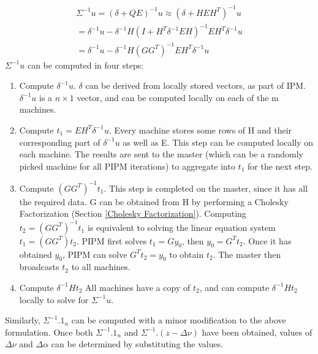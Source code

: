 \documentclass[12pt]{article}
\begin{document}
 \begin{gather} 
\Sigma^{-1}u = (\delta+QE)^{-1}u \approx (\delta+HEH^T)^{-1}u\\
= \delta^{-1}u - \delta^{-1}H(I + H^T \delta^{-1}EH)^{-1}EH^T \delta^{-1}u\\
= \delta^{-1}u - \delta^{-1}H(GG^{T})^{-1}EH^T \delta^{-1}u
\end{gather}
$\Sigma^{-1}u$ can be computed in four steps:
\begin{enumerate}
\item Compute $\delta^{-1}u$. $\delta$ can be derived from locally stored vectors, as part of IPM. $\delta^{-1}u$ is a $n \times 1$ vector, and can be computed locally on each of the m machines.
\item Compute $t_{1} = EH^{T} \delta^{-1}u$. Every machine stores some rows of H and their corresponding part of $\delta^{-1}u$ as well as E. This step can be computed locally on each machine. The results are sent to the master (which can be a randomly picked machine for all PIPM iterations) to aggregate into $t_{1}$ for the next step.
\item Compute $(GG^T )^{-1}t_{1}$. This step is completed on the master, since it has all the required data. G can be obtained from H by performing a Cholesky Factorization (Section \ref{Cholesky Factorization}). Computing $t_{2} = (GG^T )^{-1}t_{1}$ is equivalent to solving the linear equation system $t_{1} = (GG^T )t_{2}$. PIPM first solves $t_{1} = Gy_{0}$, then $y_{0} = G^T t_{2}$. Once it has obtained $y_{0}$, PIPM can solve $G^T t_{2} = y_{0}$ to obtain $t_{2}$. The master then broadcasts $t_{2}$ to all machines.
\item Compute $\delta^{-1}Ht_{2}$ All machines have a copy of $t_{2}$, and can compute $\delta^{-1}Ht_{2}$ locally to solve for $\Sigma^{-1}u$.
\end{enumerate}
Similarly, $\Sigma^{-1}.1_{n}$ can be computed with a minor modification to the above formulation. Once both $\Sigma^{-1}.1_{n}$ and $\Sigma^{-1}.(z - \Delta\nu)$ have been obtained, values of $\Delta\nu$ and $\Delta\alpha$ can be determined by substituting the values.
\end{document}
